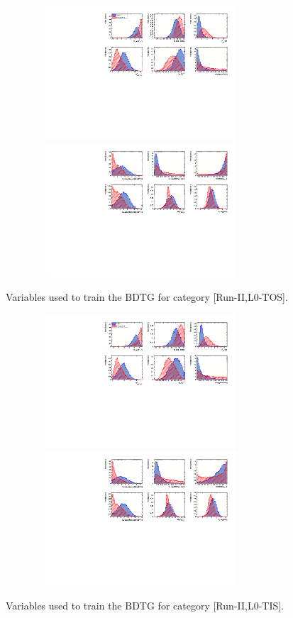 \begin{figure}[h]
\centering
\includegraphics[height=5cm,width=0.9\textwidth]{figs/TMVA/BDTG_Data_run2_t0_all/variables_id_c1.pdf}
\includegraphics[height=5cm,width=0.9\textwidth]{figs/TMVA/BDTG_Data_run2_t0_all/variables_id_c2.pdf}
\caption{Variables used to train the BDTG for category [Run-II,\textsf{L0-TOS}].}
\label{fig:}
\includegraphics[height=5cm,width=0.9\textwidth]{figs/TMVA/BDTG_Data_run2_t1_all/variables_id_c1.pdf}
\includegraphics[height=5cm,width=0.9\textwidth]{figs/TMVA/BDTG_Data_run2_t1_all/variables_id_c2.pdf}
\caption{Variables used to train the BDTG for category [Run-II,\textsf{L0-TIS}].}
\label{fig:}
\end{figure}

